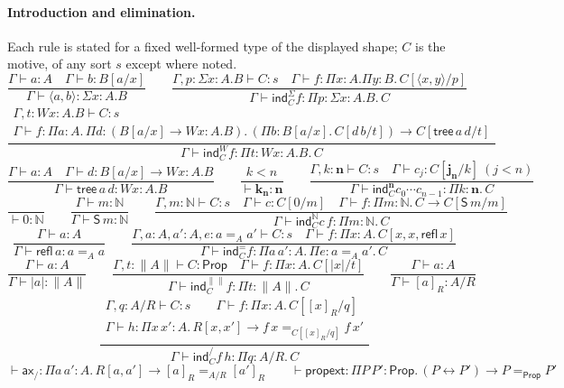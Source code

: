 \documentclass[10pt]{article}
\newcommand{\N}{\mathbb{N}}
\newcommand{\Prop}{\mathsf{Prop}}
\begin{document}
\paragraph{Introduction and elimination.}
Each rule is stated for a fixed well-formed type of the displayed shape;
$C$ is the motive, of any sort $s$ except where noted.
\[
\frac{\Gamma\vdash a:A\quad\Gamma\vdash b:B[a/x]}{\Gamma\vdash\langle a,b\rangle:\Sigma x{:}A.B}\qquad
\frac{\Gamma,p{:}\Sigma x{:}A.B\vdash C:s\quad\Gamma\vdash f:\Pi x{:}A.\Pi y{:}B.\,C[\langle x,y\rangle/p]}
     {\Gamma\vdash\mathsf{ind}^\Sigma_C f:\Pi p{:}\Sigma x{:}A.B.\,C}
\]
\[
\frac{\begin{array}{c}\Gamma,t{:}Wx{:}A.B\vdash C:s\\
      \Gamma\vdash f:\Pi a{:}A.\,\Pi d{:}(B[a/x]\to Wx{:}A.B).\,(\Pi b{:}B[a/x].\,C[d\,b/t])\to C[\mathsf{tree}\,a\,d/t]\end{array}}
     {\Gamma\vdash\mathsf{ind}^W_C f:\Pi t{:}Wx{:}A.B.\,C}
\]
\[
\frac{\Gamma\vdash a:A\quad\Gamma\vdash d:B[a/x]\to Wx{:}A.B}{\Gamma\vdash\mathsf{tree}\,a\,d:Wx{:}A.B}\qquad
\frac{k<n}{\vdash\mathbf k_{\mathbf n}:\mathbf n}\qquad
\frac{\Gamma,k{:}\mathbf n\vdash C:s\quad\Gamma\vdash c_j:C[\mathbf j_{\mathbf n}/k]\ (j<n)}
     {\Gamma\vdash\mathsf{ind}^{\mathbf n}_C c_0\cdots c_{n-1}:\Pi k{:}\mathbf n.\,C}
\]
\[
\frac{}{\vdash 0:\N}\qquad\frac{\Gamma\vdash m:\N}{\Gamma\vdash\mathsf S\,m:\N}\qquad
\frac{\Gamma,m{:}\N\vdash C:s\quad\Gamma\vdash c:C[0/m]\quad\Gamma\vdash f:\Pi m{:}\N.\,C\to C[\mathsf S\,m/m]}
     {\Gamma\vdash\mathsf{ind}^\N_C c\,f:\Pi m{:}\N.\,C}
\]
\[
\frac{\Gamma\vdash a:A}{\Gamma\vdash\mathsf{refl}\,a:a=_A a}\qquad
\frac{\Gamma,a{:}A,a'{:}A,e{:}a=_A a'\vdash C:s\quad\Gamma\vdash f:\Pi x{:}A.\,C[x,x,\mathsf{refl}\,x]}
     {\Gamma\vdash\mathsf{ind}^=_C f:\Pi a\,a'{:}A.\,\Pi e{:}a=_A a'.\,C}
\]
\[
\frac{\Gamma\vdash a:A}{\Gamma\vdash|a|:\|A\|}\qquad
\frac{\Gamma,t{:}\|A\|\vdash C:\Prop\quad\Gamma\vdash f:\Pi x{:}A.\,C[|x|/t]}
     {\Gamma\vdash\mathsf{ind}^{\|\|}_C f:\Pi t{:}\|A\|.\,C}\qquad
\frac{\Gamma\vdash a:A}{\Gamma\vdash[a]_R:A/R}
\]
\[
\frac{\begin{array}{c}\Gamma,q{:}A/R\vdash C:s\qquad\Gamma\vdash f:\Pi x{:}A.\,C[[x]_R/q]\\
      \Gamma\vdash h:\Pi x\,x'{:}A.\,R[x,x']\to f\,x=_{C[[x]_R/q]}f\,x'\end{array}}
     {\Gamma\vdash\mathsf{ind}^/_C f\,h:\Pi q{:}A/R.\,C}
\]
\[
\vdash\mathsf{ax}_/:\Pi a\,a'{:}A.\,R[a,a']\to[a]_R=_{A/R}[a']_R\qquad
\vdash\mathsf{propext}:\Pi P\,P'{:}\Prop.\,(P\leftrightarrow P')\to P=_\Prop P'
\]
\end{document}
